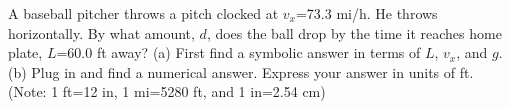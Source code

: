         A baseball pitcher throws a pitch clocked at $v_x$=73.3
        mi/h. He throws horizontally. By what amount, $d$, does the
        ball drop by the time it reaches home plate, $L$=60.0 ft away?\hwendpart
        (a) First find a symbolic answer in terms of $L$, $v_x$, and $g$.\answercheck\hwendpart
        (b) Plug in and find a numerical answer. Express your
        answer in units of ft. (Note: 1 ft=12 in, 1 mi=5280 ft, and
        1 in=2.54 cm) \answercheck
